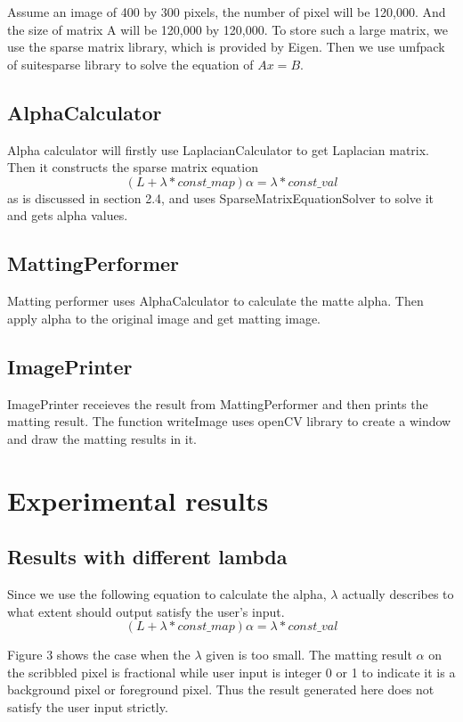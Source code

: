 \documentclass[11pt,letterpaper]{article}
\begin{document}
Assume an image of 400 by 300 pixels, the number of pixel will be 120,000. And the size of matrix A will be 120,000 by 120,000. To store such a large matrix, we use the sparse matrix library, which is provided by Eigen. Then we use umfpack of suitesparse library to solve the equation of $Ax=B$. \\

\subsection{AlphaCalculator}
Alpha calculator will firstly use LaplacianCalculator to get Laplacian matrix. Then it constructs the sparse matrix equation
$$(L + \lambda * const\_map)\alpha = \lambda * const\_val$$
as is discussed in section 2.4, and uses SparseMatrixEquationSolver to solve it and gets alpha values.

\subsection{MattingPerformer}
Matting performer uses AlphaCalculator to calculate the matte alpha. Then apply alpha to the original image and get matting image.

\subsection{ImagePrinter}
ImagePrinter receieves the result from MattingPerformer and then prints the matting result. The function writeImage uses openCV library to create a window and draw the matting results in it. 

\section{Experimental results}

\subsection{Results with different lambda}
Since we use the following equation to calculate the alpha, $\lambda$ actually describes to what extent should output satisfy the user's input. 
$$(L + \lambda * const\_map)\alpha = \lambda * const\_val$$

Figure 3 shows the case when the $\lambda$ given is too small. The matting result $\alpha$ on the scribbled pixel is fractional while user input is integer 0 or 1 to indicate it is a background pixel or foreground pixel. Thus the result generated here does not satisfy the user input strictly.
\end{document}

